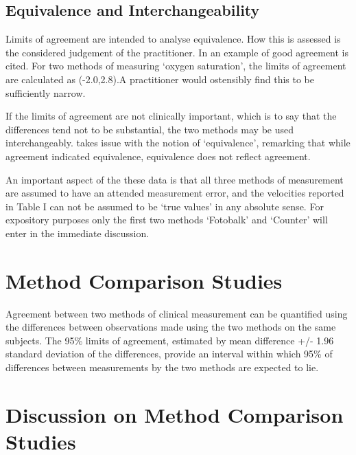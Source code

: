 \documentclass[Main.tex]{subfiles}
\begin{document}
\subsection{Equivalence and Interchangeability}
Limits of agreement are intended to analyse equivalence. How this
is assessed is the considered judgement of the practitioner. In
\citet{BA86} an example of good agreement is cited. For two
methods of measuring `oxygen saturation', the limits of agreement
are calculated as (-2.0,2.8).A practitioner would ostensibly find
this to be sufficiently narrow.

If the limits of agreement are not clinically important, which is
to say that the differences tend not to be substantial, the two
methods may be used interchangeably. \citet{DunnSEME} takes issue
with the notion of `equivalence', remarking that while agreement
indicated equivalence, equivalence does not reflect agreement.



	An important aspect of the these data is that all three methods of
	measurement are assumed to have an attended measurement error, and
	the velocities reported in Table I can not be assumed to be `true
	values' in any absolute sense. For expository purposes only the
	first two methods `Fotobalk' and `Counter' will enter in the
	immediate discussion.

		
	
		


\section{Method Comparison Studies}
	
	Agreement between two methods of clinical measurement can be quantified using the differences between observations made using the two methods on the same subjects. The 95\% limits of agreement, estimated by mean difference +/- 1.96 standard deviation of the differences, provide an interval within which 95\% of differences between measurements by the two methods are expected to lie.
	


\section{Discussion on Method Comparison Studies}
\end{document}
